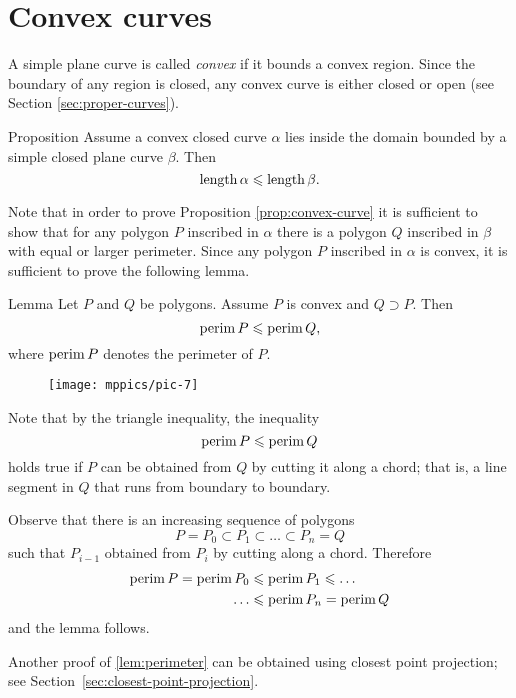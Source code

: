 \section{Convex curves}

A simple plane curve is called \emph{convex} if it bounds a convex region.
Since the boundary of any region is closed, any convex curve is either closed or open (see Section \ref{sec:proper-curves}).

\begin{thm}{Proposition}\label{prop:convex-curve}
Assume a convex closed curve $\alpha$ lies inside the domain bounded by a simple closed plane curve $\beta$.
Then
\[\mathop{\rm length}\nolimits\alpha\leqslant \mathop{\rm length}\nolimits\beta.\]
\end{thm}

Note that in order to prove Proposition \ref{prop:convex-curve} it is sufficient to show that for any polygon  $P$ inscribed in $\alpha$ there is a polygon $Q$ inscribed in $\beta$ with equal or larger perimeter. Since any polygon $P$ inscribed in $\alpha$ is convex, it is sufficient to prove the following lemma.


\begin{thm}{Lemma}\label{lem:perimeter}
Let $P$ and $Q$ be polygons.
Assume $P$ is convex and $Q\supset P$.
Then 
\[\mathop{\rm perim}\nolimits P\leqslant \mathop{\rm perim}\nolimits Q,\]
where $\mathop{\rm perim}\nolimits P$ denotes the perimeter of $P$.
\end{thm}


\begin{wrapfigure}{o}{24 mm}
\vskip-0mm
\centering
\texttt{[image: mppics/pic-7]}
\vskip0mm
\end{wrapfigure}

Note that by the triangle inequality,
the inequality
\[\mathop{\rm perim}\nolimits P\leqslant \mathop{\rm perim}\nolimits Q\]
holds true
if $P$ can be obtained from $Q$ by cutting it along a chord;
that is, a line segment in $Q$ that runs from boundary to boundary.

Observe that there is an increasing sequence of polygons 
$$P=P_0\subset P_1\subset\dots\subset P_n=Q$$
such that $P_{i-1}$ obtained from $P_{i}$ by cutting along a chord.
Therefore 
\begin{align*}
\mathop{\rm perim}\nolimits P=\mathop{\rm perim}\nolimits P_0&\leqslant\mathop{\rm perim}\nolimits P_1\leqslant\dots
\\
\dots&\leqslant\mathop{\rm perim}\nolimits P_n=\mathop{\rm perim}\nolimits Q
\end{align*}
and the lemma follows.
\qeds

Another proof of \ref{lem:perimeter} can be obtained using closest point projection; see Section~\ref{sec:closest-point-projection}.  

